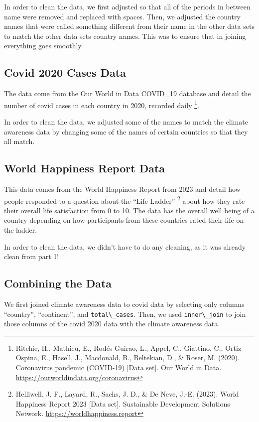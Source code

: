 \documentclass[
]{article}
\begin{document}
In order to clean the data, we first adjusted so that all of the periods in between name were removed and replaced with spaces. Then, we adjusted the country names that were called something different from their name in the other data sets to match the other data sets country names. This was to ensure that in joining everything goes smoothly.

\subsection{Covid 2020 Cases Data}\label{covid-2020-cases-data}

The data come from the Our World in Data COVID\_19 database and detail the number of covid cases in each country in 2020, recorded daily \footnote{Ritchie, H., Mathieu, E., Rodés-Guirao, L., Appel, C., Giattino, C., Ortiz-Ospina, E., Hasell, J., Macdonald, B., Beltekian, D., \& Roser, M. (2020). Coronavirus pandemic (COVID-19) {[}Data set{]}. Our World in Data. \url{https://ourworldindata.org/coronavirus}}.

In order to clean the data, we adjusted some of the names to match the climate awareness data by changing some of the names of certain countries so that they all match.

\subsection{World Happiness Report Data}\label{world-happiness-report-data}

This data comes from the World Happiness Report from 2023 and detail how people responded to a question about the ``Life Ladder'' \footnote{Helliwell, J. F., Layard, R., Sachs, J. D., \& De Neve, J.-E. (2023). World Happiness Report 2023 {[}Data set{]}. Sustainable Development Solutions Network. \url{https://worldhappiness.report}} about how they rate their overall life satisfaction from 0 to 10. The data has the overall well being of a country depending on how participants from these countries rated their life on the ladder.

In order to clean the data, we didn't have to do any cleaning, as it was already clean from part 1!

\subsection{Combining the Data}\label{combining-the-data}

We first joined climate awareness data to covid data by selecting only columns ``country'', ``continent'', and \texttt{total\textbackslash{}\_cases}. Then, we used \texttt{inner\textbackslash{}\_join} to join those columns of the covid 2020 data with the climate awareness data.
\end{document}
